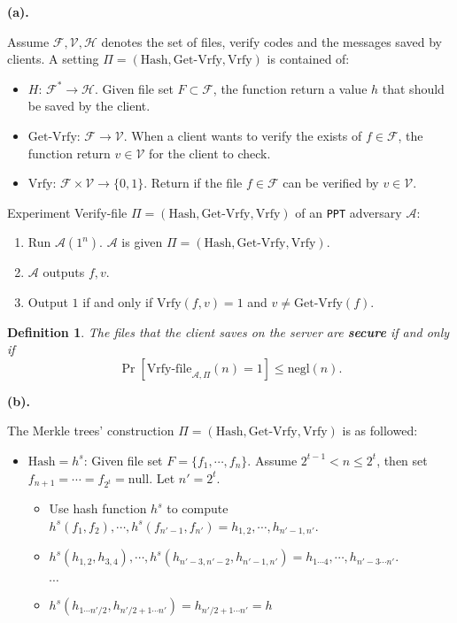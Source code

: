 \documentclass[a4paper]{article}
\newtheorem{definition}{Definition}
\newcommand{\negl}{\text{negl}}
\newcommand{\Vrfy}{\text{Vrfy}}
\newcommand{\Getvrfy}{\text{Get-Vrfy}}
\newcommand{\hash}{\text{Hash}}
\newcommand{\vrfyfile}{\text{Vrfy-file}}
\newcommand{\F}{\mathcal{F}}
\newcommand{\h}{\mathcal{H}}
\newcommand{\V}{\mathcal{V}}
\newcommand{\A}{\mathcal{A}}
\newenvironment{problem}[2][Problem]{\begin{trivlist}
\item[\hskip \labelsep {\bfseries #1}\hskip \labelsep {\bfseries #2.}]}{\end{trivlist}}
\begin{document}
\begin{problem}{5.14}
\textbf{(a).}\par
Assume $\F,\V,\h$ denotes the set of files, verify codes and the messages saved by clients.
A setting $\Pi=(\hash,\Getvrfy,\Vrfy)$ is contained of:
\begin{itemize}
    \item $H$: $\F^*\rightarrow\h$. Given file set $F\subset\F$, the function return a value $h$ that should be saved by the client.
    \item $\Getvrfy$: $\F\rightarrow\V$. When a client wants to verify the exists of $f\in\F$, the function return $v\in \V$ for the client to check.
    \item $\Vrfy$: $\F\times\V\rightarrow\{0,1\}$. Return if the file $f\in\F$ can be verified by $v\in\V$.
\end{itemize}
Experiment Verify-file $\Pi=(\hash,\Getvrfy,\Vrfy)$ of an \texttt{PPT} adversary $\A$:
\begin{enumerate}
    \item Run $\A(1^n)$. $\A$ is given $\Pi=(\hash,\Getvrfy,\Vrfy)$.
    \item $\A$ outputs $f,v$.
    \item Output $1$ if and only if $\Vrfy(f,v)=1$ and $v\ne\Getvrfy(f)$.
\end{enumerate}
\begin{definition}
The files that the client saves on the server are \textbf{secure} if and only if 
\[\Pr[\vrfyfile_{\A,\Pi}(n)=1]\le\negl(n).\]
\end{definition}\par\vspace{3ex}
\textbf{(b).}\par
The Merkle trees' construction $\Pi=(\hash,\Getvrfy,\Vrfy)$ is as followed:
\begin{itemize}
    \item $\hash=h^s$: Given file set $F=\{f_1,\cdots,f_n\}$. Assume $2^{t-1}<n\le2^{t}$, then set $f_{n+1}=\cdots=f_{2^t}=\text{null}$. Let $n'=2^t$.\begin{itemize}
        \item Use hash function $h^s$ to compute $h^s(f_1,f_2),\cdots,h^s(f_{n'-1},f_{n'})=h_{1,2},\cdots,h_{n'-1,n'}$.
        \item $h^s(h_{1,2},h_{3,4}),\cdots,h^s(h_{n'-3,n'-2},h_{n'-1,n'})=h_{1\cdots4},\cdots,h_{n'-3\cdots n'}$.\par
        $\cdots$\par
        \item $h^s(h_{1\cdots n'/2},h_{n'/2+1\cdots n'})=h_{n'/2+1\cdots n'}=h$

\end{itemize}
\end{itemize}
\end{problem}
\end{document}
